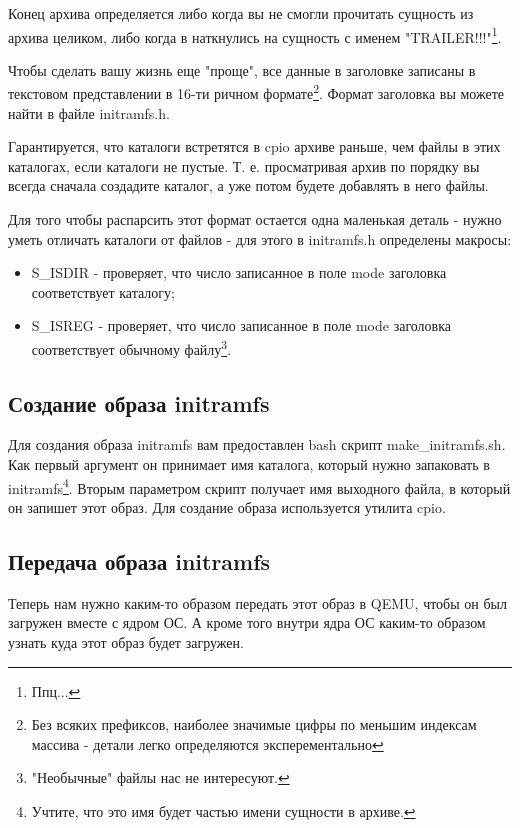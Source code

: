 Конец архива определяется либо когда вы не смогли прочитать сущность из архива
целиком, либо когда в наткнулись на сущность с именем "TRAILER!!!"\footnote{Ппц...}.

Чтобы сделать вашу жизнь еще "проще", все данные в заголовке записаны в текстовом
представлении в 16-ти ричном формате\footnote{Без всяких префиксов, наиболее
значимые цифры по меньшим индексам массива - детали легко определяются
эксперементально}. Формат заголовка вы можете найти в файле initramfs.h.

Гарантируется, что каталоги встретятся в cpio архиве раньше, чем файлы в этих
каталогах, если каталоги не пустые. Т. е. просматривая архив по порядку вы
всегда сначала создадите каталог, а уже потом будете добавлять в него файлы.

Для того чтобы распарсить этот формат остается одна маленькая деталь - нужно
уметь отличать каталоги от файлов - для этого в initramfs.h определены макросы:

\begin{itemize}
  \item S\_ISDIR - проверяет, что число записанное в поле mode заголовка
        соответствует каталогу;
  \item S\_ISREG - проверяет, что число записанное в поле mode заголовка
        соответствует обычному файлу\footnote{"Необычные" файлы нас не интересуют.}.
\end{itemize}

\subsection{Создание образа initramfs}

Для создания образа initramfs вам предоставлен bash скрипт make\_initramfs.sh.
Как первый аргумент он принимает имя каталога, который нужно запаковать в
initramfs\footnote{Учтите, что это имя будет частью имени сущности в архиве.}.
Вторым параметром скрипт получает имя выходного файла, в который он запишет
этот образ. Для создание образа используется утилита cpio.

\subsection{Передача образа initramfs}

Теперь нам нужно каким-то образом передать этот образ в QEMU, чтобы он был
загружен вместе с ядром ОС. А кроме того внутри ядра ОС каким-то образом узнать
куда этот образ будет загружен.

